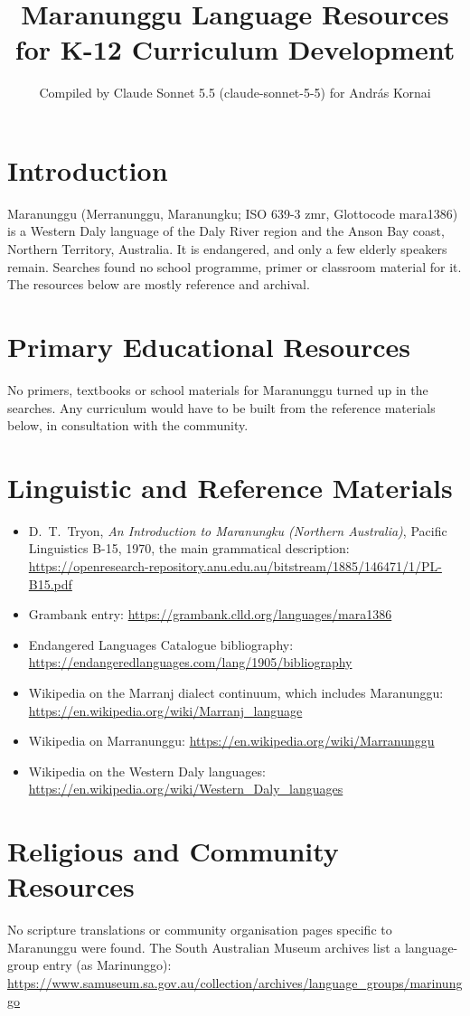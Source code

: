 \documentclass[12pt]{article}
\title{Maranunggu Language Resources for K-12 Curriculum Development}
\author{Compiled by Claude Sonnet 5.5 (claude-sonnet-5-5) for Andr\'as Kornai}
\date{}
\begin{document}
\maketitle

\section{Introduction}
Maranunggu (Merranunggu, Maranungku; ISO 639-3 zmr, Glottocode mara1386) is a Western Daly language of the Daly River region and the Anson Bay coast, Northern Territory, Australia. It is endangered, and only a few elderly speakers remain. Searches found no school programme, primer or classroom material for it. The resources below are mostly reference and archival.

\section{Primary Educational Resources}
No primers, textbooks or school materials for Maranunggu turned up in the searches. Any curriculum would have to be built from the reference materials below, in consultation with the community.

\section{Linguistic and Reference Materials}
\begin{itemize}
\item D.\ T.\ Tryon, \emph{An Introduction to Maranungku (Northern Australia)}, Pacific Linguistics B-15, 1970, the main grammatical description: \url{https://openresearch-repository.anu.edu.au/bitstream/1885/146471/1/PL-B15.pdf}
\item Grambank entry: \url{https://grambank.clld.org/languages/mara1386}
\item Endangered Languages Catalogue bibliography: \url{https://endangeredlanguages.com/lang/1905/bibliography}
\item Wikipedia on the Marranj dialect continuum, which includes Maranunggu: \url{https://en.wikipedia.org/wiki/Marranj_language}
\item Wikipedia on Marranunggu: \url{https://en.wikipedia.org/wiki/Marranunggu}
\item Wikipedia on the Western Daly languages: \url{https://en.wikipedia.org/wiki/Western_Daly_languages}
\end{itemize}

\section{Religious and Community Resources}
No scripture translations or community organisation pages specific to Maranunggu were found. The South Australian Museum archives list a language-group entry (as Marinunggo): \url{https://www.samuseum.sa.gov.au/collection/archives/language_groups/marinunggo}
\end{document}
